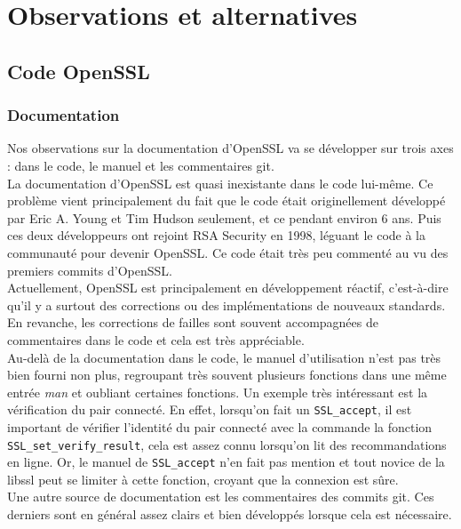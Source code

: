 \chapter{Observations et alternatives}
\section{Code OpenSSL}

\subsection{Documentation}
Nos observations sur la documentation d'OpenSSL va se développer sur trois axes : dans le code, le manuel et les commentaires git.\\


La documentation d'OpenSSL est quasi inexistante dans le code lui-même. 
Ce problème vient principalement du fait que le code était originellement développé par Eric A. Young et Tim Hudson seulement, et ce pendant environ 6 ans. Puis ces deux développeurs ont rejoint RSA Security en 1998, léguant le code à la communauté pour devenir OpenSSL. Ce code était très peu commenté au vu des premiers commits d'OpenSSL. \\


Actuellement, OpenSSL est principalement en développement réactif, c'est-à-dire qu'il y a surtout des corrections ou des implémentations de nouveaux standards. En revanche, les corrections de failles sont souvent accompagnées de commentaires dans le code et cela est très appréciable.\\


Au-delà de la documentation dans le code, le manuel d'utilisation n'est pas très bien fourni non plus, regroupant très souvent plusieurs fonctions dans une même entrée \textit{man} et oubliant certaines fonctions. Un exemple très intéressant est la vérification du pair connecté. En effet, lorsqu'on fait un \verb+SSL_accept+, il est important de vérifier l'identité du pair connecté avec la commande la fonction \verb+SSL_set_verify_result+, cela est assez connu lorsqu'on lit des recommandations en ligne. Or, le manuel de \verb+SSL_accept+ n'en fait pas mention et tout novice de la libssl peut se limiter à cette fonction, croyant que la connexion est sûre.\\


Une autre source de documentation est les commentaires des commits git. Ces derniers sont en général assez clairs et bien développés lorsque cela est nécessaire.

